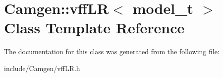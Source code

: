 \hypertarget{a00590}{}\section{Camgen\+:\+:vff\+L\+R$<$ model\+\_\+t $>$ Class Template Reference}
\label{a00590}


The documentation for this class was generated from the following file\+:\begin{DoxyCompactItemize}
\item 
include/\+Camgen/vff\+L\+R.\+h\end{DoxyCompactItemize}
